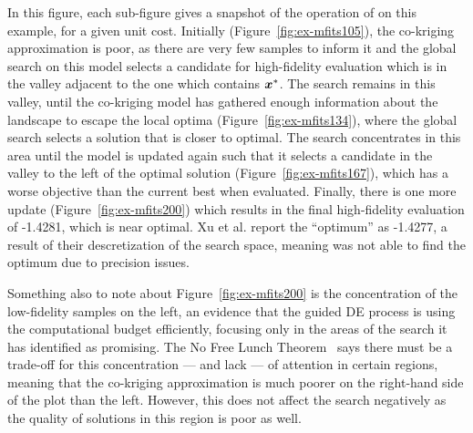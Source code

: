 In this figure, each sub-figure gives a snapshot of the operation of \AlgName{} on this example, for a given unit cost. Initially (Figure~\ref{fig:ex-mfits105}), the co-kriging approximation is poor, as there are very few samples to inform it and the global search on this model selects a candidate for high-fidelity evaluation which is in the valley adjacent to the one which contains $\boldsymbol{x}^*$. The search remains in this valley, until the co-kriging model has gathered enough information about the landscape to escape the local optima (Figure~\ref{fig:ex-mfits134}), where the global search selects a solution that is closer to optimal. The search concentrates in this area until the model is updated again such that it selects a candidate in the valley to the left of the optimal solution (Figure~\ref{fig:ex-mfits167}), which has a worse objective than the current best when evaluated. Finally, there is one more update (Figure~\ref{fig:ex-mfits200}) which results in the final high-fidelity evaluation of -1.4281, which is near optimal. Xu et al. report the ``optimum'' as -1.4277, a result of their descretization of the search space, meaning \motos{} was not able to find the optimum due to precision issues.

Something also to note about Figure~\ref{fig:ex-mfits200} is the concentration of the low-fidelity samples on the left, an evidence that the guided DE process is using the computational budget efficiently, focusing only in the areas of the search it has identified as promising. The No Free Lunch Theorem~\cite{wolpert1997no} says there must be a trade-off for this concentration --- and lack --- of attention in certain regions, meaning that the co-kriging approximation is much poorer on the right-hand side of the plot than the left. However, this does not affect the search negatively as the quality of solutions in this region is poor as well.